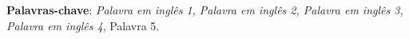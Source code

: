 \setlength{\absparsep}{18pt} %
\begin{resumo}
    \lipsum[1-2]
    
    \textbf{Palavras-chave}: \textit{Palavra em inglês 1, Palavra em inglês 2, Palavra em inglês 3, Palavra em inglês 4}, Palavra 5.
    
\end{resumo}